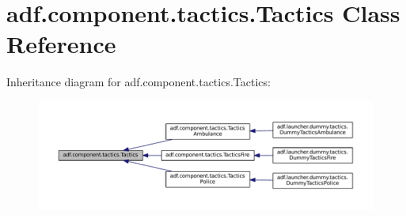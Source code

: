 \hypertarget{classadf_1_1component_1_1tactics_1_1Tactics}{}\section{adf.\+component.\+tactics.\+Tactics Class Reference}
\label{classadf_1_1component_1_1tactics_1_1Tactics}


Inheritance diagram for adf.\+component.\+tactics.\+Tactics\+:
\nopagebreak
\begin{figure}[H]
\begin{center}
\leavevmode
\includegraphics[width=350pt]{classadf_1_1component_1_1tactics_1_1Tactics__inherit__graph}
\end{center}
\end{figure}
